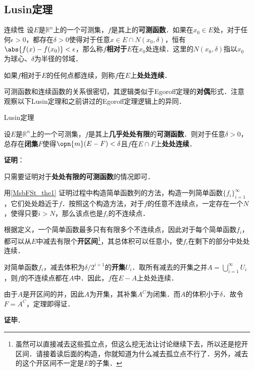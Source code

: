 \subsection{Lusin定理}

\begin{definition}{连续性}
设$E$是$\mathbb{R}^n$上的一个可测集，$f$是其上的\textbf{可测函数}．如果在$x_0\in E$处，对于任何$\epsilon>0$，都存在$\delta>0$使得对于任意$x\in E\cap N(x_0, \delta)$，恒有$\abs{f(x)-f(x_0)}<\epsilon$，那么称$f$\textbf{相对于}$E$在$x_0$处连续．这里的$N(x_0, \delta)$指以$x_0$为球心、$\delta$为半径的邻域．

如果$f$相对于$E$的任何点都连续，则称$f$在$E$上\textbf{处处连续}．
\end{definition}

可测函数和连续函数的关系很密切，其逻辑类似于Egoroff定理的\textbf{对偶}形式．注意观察以下Lusin定理和之前讲过的Egoroff定理逻辑上的异同．

\begin{theorem}{Lusin定理}

设$E$是$\mathbb{R}^n$上的一个可测集，$f$是其上\textbf{几乎处处有限}的\textbf{可测函数}．则对于任意$\delta>0$，总存在\textbf{闭集}$F$使得$\opn{m}(E-F)<\delta$且$f$在$E\cap F$上\textbf{处处连续}．

\end{theorem}

\textbf{证明}：

只需要证明对于\textbf{处处有限的可测函数}的情况即可．

用\autoref{MsbFSt_the1}  证明过程中构造简单函数列的方法，构造一列简单函数$\{f_i\}_{i=1}^\infty$，它们处处趋近于$f$．按照这个构造方法，对于$f$的任意不连续点，一定存在一个$N$，使得只要$i>N$，那么该点也是$f_i$的不连续点．

根据定义，一个简单函数最多只有有限多个不连续点，因此对于每个简单函数$f_i$，都可以从$E$中减去有限个\textbf{开区间}\footnote{虽然可以直接减去这些孤立点，但这么挖无法让讨论继续下去，所以还是挖开区间．请接着读后面的构造，你就知道为什么减去孤立点不行了．另外，减去的这个开区间不一定是$E$的子集．}，其总体积可以任意小，使$f_i$在剩下的部分中处处连续．

对简单函数$f_i$，减去体积为$\delta/2^{i+1}$的\textbf{开集}$U_i$．取所有减去的开集之并$A=\bigcup_{i=1}^\infty U_i$，则$f$的不连续点都在$A$中．因此，$f$在$E-A$上处处连续．

由于$A$是开区间的并，因此$A$为开集，其补集$A^C$为闭集．而$A$的体积小于$\delta$．故令$F=A^C$，定理即得证．

\textbf{证毕}．


















